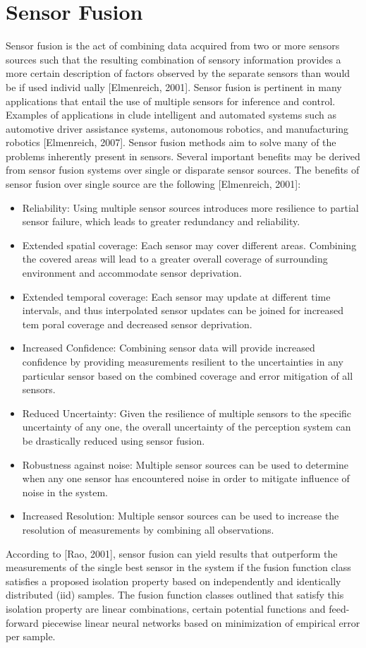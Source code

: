 \section{Sensor Fusion}
Sensor fusion is the act of combining data acquired from two or more sensors sources
such that the resulting combination of sensory information provides a more certain description of factors observed by the separate sensors than would be if used individ
ually [Elmenreich, 2001]. Sensor fusion is pertinent in many applications that entail
the use of multiple sensors for inference and control. Examples of applications in
clude intelligent and automated systems such as automotive driver assistance systems,
autonomous robotics, and manufacturing robotics [Elmenreich, 2007].
Sensor fusion methods aim to solve many of the problems inherently present in
sensors. Several important beneﬁts may be derived from sensor fusion systems over
single or disparate sensor sources. The beneﬁts of sensor fusion over single source are
the following [Elmenreich, 2001]:
\begin{itemize}
 \item Reliability: Using multiple sensor sources introduces more resilience to partial sensor failure, which leads to greater redundancy and reliability.
 \item Extended spatial coverage: Each sensor may cover diﬀerent areas. Combining the covered areas will lead to a greater overall coverage of surrounding
environment and accommodate sensor deprivation.
 \item Extended temporal coverage: Each sensor may update at diﬀerent time intervals, and thus interpolated sensor updates can be joined for increased tem
poral coverage and decreased sensor deprivation.
 \item Increased Conﬁdence: Combining sensor data will provide increased conﬁdence by providing measurements resilient to the uncertainties in any particular
sensor based on the combined coverage and error mitigation of all sensors. \item  Reduced Uncertainty: Given the resilience of multiple sensors to the speciﬁc uncertainty of any one, the overall uncertainty of the perception system can be
drastically reduced using sensor fusion.
 \item Robustness against noise: Multiple sensor sources can be used to determine when any one sensor has encountered noise in order to mitigate inﬂuence of
noise in the system.
 \item Increased Resolution: Multiple sensor sources can be used to increase the resolution of measurements by combining all observations.
\end{itemize}
According to [Rao, 2001], sensor fusion can yield results that outperform the measurements of the single best sensor in the system if the fusion function class satisﬁes a
proposed isolation property based on independently and identically distributed (iid)
samples. The fusion function classes outlined that satisfy this isolation property
are linear combinations, certain potential functions and feed-forward piecewise linear
neural networks based on minimization of empirical error per sample.



